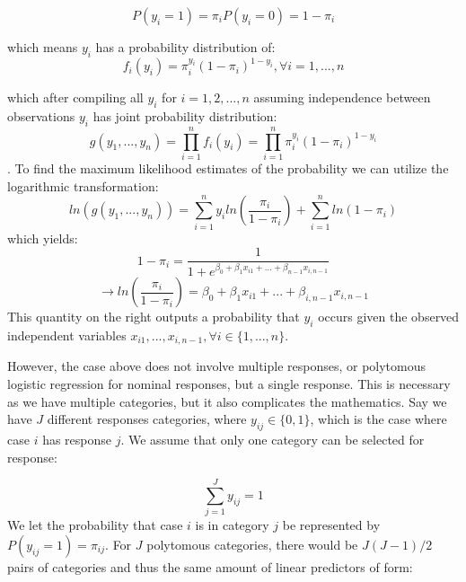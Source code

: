 \documentclass[titlepage, 12pt]{article}
\begin{document}
\begin{equation}
    P(y_i = 1) = \pi_i
    P(y_i = 0) = 1 - \pi_i
\end{equation}

which means $y_i$ has a probability distribution of:
\begin{equation}
    f_i(y_i) = \pi_i^{y_i}(1-\pi_i)^{1-y_i}, \forall i =1,...,n
\end{equation}

which after compiling all $y_i$ for $i = 1, 2, ..., n$ assuming independence between observations $y_i$ has joint probability distribution:
\begin{equation}
    g(y_1, ..., y_n) = \prod_{i=1}^{n} f_i(y_i)= \prod_{i=1}^{n}\pi_i^{y_i}(1-\pi_i)^{1-y_i}
\end{equation}.
To find the maximum likelihood estimates of the probability we can utilize the logarithmic transformation:
\begin{equation}
    ln(g(y_1, ..., y_n)) =\sum_{i=1}^{n} y_i ln(\frac{\pi_i}{1-\pi_i}) + \sum_{i=1}^{n}ln(1-\pi_i)
\end{equation}
which yields:
\begin{equation}
    1-\pi_i = \frac{1}{1+e^{\beta_0 + \beta_1x_{i1} + ... + \beta_{n-1}x_{i,n-1}}} 
\end{equation}
\begin{equation}
    \rightarrow ln(\frac{\pi_i}{1-\pi_i})=\beta_0 + \beta_1x_{i1} + ...+\beta_{i,n-1}x_{i, n-1}
\end{equation}
This quantity on the right outputs a probability that $y_i$ occurs given the observed independent variables $x_{i1}, ..., x_{i, n-1}, \forall i \in \{1,..., n\}$.
\citep{alsm.2005}

\hspace{0.5 cm}However, the case above does not involve multiple responses, or polytomous logistic regression for nominal responses, but a single response. This is necessary as we have multiple categories, but it also complicates the mathematics. Say we have $J$ different responses categories, where $y_{ij} \in \{0,1\}$, which is the case where case $i$ has response $j$. We assume that only one category can be selected for response:

\begin{equation}
    \sum_{j=1}^{J} y_{ij} =1
\end{equation}
We let the probability that case $i$ is in category $j$ be represented by $P(y_{ij} = 1) = \pi_{ij}$. For $J$ polytomous categories, there would be $J(J-1)/2$ pairs of categories and thus the same amount of linear predictors of form:
\end{document}
